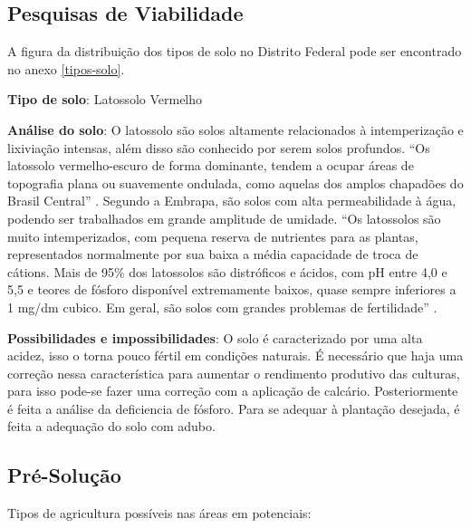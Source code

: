 \subsection{Pesquisas de Viabilidade}

  A figura da distribuição dos tipos de solo no Distrito Federal pode ser encontrado no anexo \ref{tipos-solo}.

  \textbf{Tipo de solo}: Latossolo Vermelho

  \textbf{Análise do solo}: O latossolo são solos altamente relacionados à intemperização e lixiviação intensas, além disso são conhecido
  por serem solos profundos. “Os latossolo vermelho-escuro de forma dominante, tendem a ocupar áreas de topografia plana ou suavemente
  ondulada, como aquelas dos amplos chapadões do Brasil Central” \cite{infra2}. Segundo a Embrapa, são solos com alta permeabilidade à água, podendo
  ser trabalhados em grande amplitude de umidade. “Os latossolos são muito intemperizados, com pequena reserva de nutrientes para as
  plantas, representados normalmente por sua baixa a média capacidade de troca de cátions. Mais de 95\% dos latossolos são distróficos e
  ácidos, com pH entre 4,0 e 5,5 e teores de fósforo disponível extremamente baixos, quase sempre inferiores a 1 mg/dm cubico. Em geral, são
  solos com grandes problemas de fertilidade” \cite{infra3}.

  \textbf{Possibilidades e impossibilidades}: O solo é caracterizado por uma alta acidez, isso o torna pouco fértil em condições naturais.
  É necessário que haja uma correção nessa característica para aumentar o rendimento produtivo das culturas, para isso pode-se fazer uma
  correção com a aplicação de calcário. Posteriormente é feita a análise da deficiencia de fósforo. Para se adequar à plantação desejada,
  é feita a adequação do solo com adubo.

\subsection{Pré-Solução}

  Tipos de agricultura possíveis nas áreas em potenciais:


